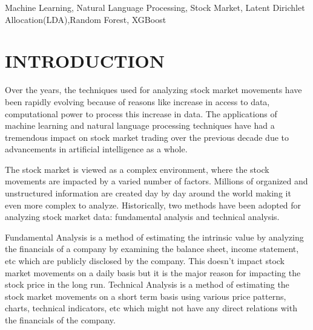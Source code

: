\documentclass[preprint,12pt]{elsarticle}
\begin{document}
\begin{frontmatter}
\begin{abstract}
\end{abstract}




\begin{keyword}
Machine Learning, Natural Language Processing, Stock Market, Latent Dirichlet Allocation(LDA),Random Forest, XGBoost

\end{keyword}

\end{frontmatter}

\section{INTRODUCTION}

Over the years, the techniques used for analyzing stock market movements have been rapidly evolving because of reasons like increase in access to data, computational power to process this increase in data. The applications of machine learning and natural language processing techniques have had a tremendous impact on stock market trading over the previous decade due to advancements in artificial intelligence as a whole.

The stock market is viewed as a complex environment, where the stock movements are impacted by a varied number of factors. Millions of organized and unstructured information are created day by day around the world making it even more complex to analyze. Historically, two methods have been adopted for analyzing stock market data: fundamental analysis and technical analysis.

Fundamental Analysis is a method of estimating the intrinsic value by analyzing the financials of a company by examining the balance sheet, income statement, etc which are publicly disclosed by the company. This doesn't impact stock market movements on a daily basis but it is the major reason for impacting the stock price in the long run. Technical Analysis is a method of estimating the stock market movements on a short term basis using various price patterns, charts, technical indicators, etc which might not have any direct relations with the financials of the company.
\end{document}
